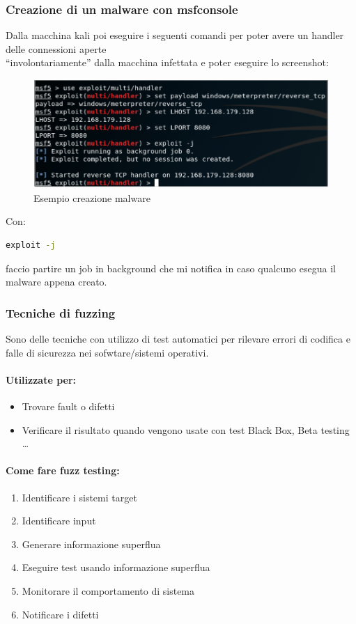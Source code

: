 \documentclass{article}
\begin{document}
\subsubsection{Creazione di un malware con msfconsole}
Dalla macchina kali poi eseguire i seguenti comandi per poter avere un handler delle connessioni aperte \\
“involontariamente” dalla macchina infettata e poter eseguire lo screenshot:
\begin{figure}[H]
    \center
    \includegraphics[scale=0.4]{images/MfsconsoleExample.png}
    \caption{Esempio creazione malware}\label{fig:1}
\end{figure}
\noindent
Con:
\begin{lstlisting}[language=bash]
    exploit -j
\end{lstlisting} faccio partire un job in background che mi notifica in caso 
qualcuno esegua il malware appena creato.
\subsubsection{Tecniche di fuzzing}
Sono delle tecniche con utilizzo di test automatici per rilevare errori di codifica e falle 
di sicurezza nei sofwtare/sistemi operativi.
\paragraph{Utilizzate per:}
\begin{itemize}
    \item Trovare fault o difetti
    \item Verificare il risultato quando vengono usate con test Black Box, Beta testing \dots
\end{itemize}
\paragraph{Come fare fuzz testing:}
\begin{enumerate}
    \item Identificare i sistemi target
    \item Identificare input
    \item Generare informazione superflua
    \item Eseguire test usando informazione superflua
    \item Monitorare il comportamento di sistema
    \item Notificare i difetti
\end{enumerate}
\end{document}
